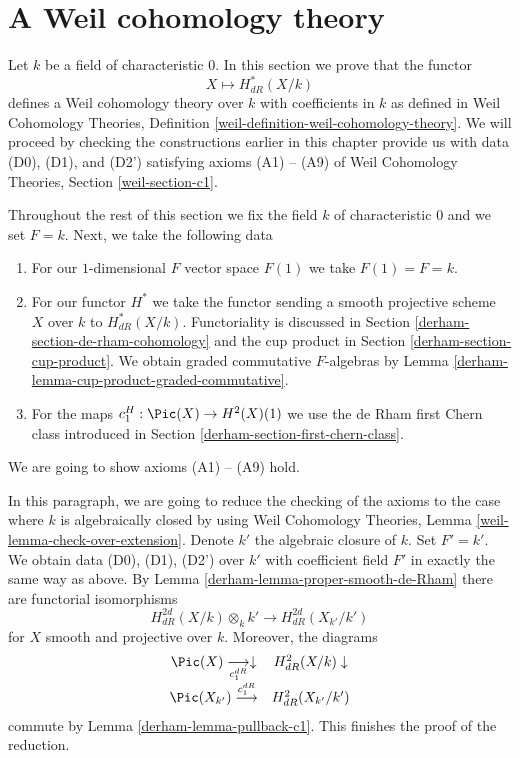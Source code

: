 \section{A Weil cohomology theory}
\label{derham-section-weil}
Let $k$ be a field of characteristic $0$. In this section we prove that
the functor
$$
X \longmapsto H^*_{dR}(X/k)
$$
defines a Weil cohomology theory over $k$ with coefficients in $k$ as defined
in Weil Cohomology Theories, Definition
\ref{weil-definition-weil-cohomology-theory}.
We will proceed by checking the constructions earlier in this
chapter provide us with data (D0), (D1), and (D2') satisfying
axioms (A1) -- (A9) of
Weil Cohomology Theories, Section \ref{weil-section-c1}.

\medskip\noindent
Throughout the rest of this section we fix the field $k$ of characteristic
$0$ and we set $F = k$. Next, we take the following data
\begin{enumerate}
\item[(D0)] For our $1$-dimensional $F$ vector space $F(1)$ we take
$F(1) = F = k$.
\item[(D1)] For our functor $H^*$ we take the functor sending
a smooth projective scheme $X$ over $k$ to $H^*_{dR}(X/k)$.
Functoriality is discussed in Section \ref{derham-section-de-rham-cohomology}
and the cup product in Section \ref{derham-section-cup-product}.
We obtain graded commutative $F$-algebras by
Lemma \ref{derham-lemma-cup-product-graded-commutative}.
\item[(D2')] For the maps $c_1^H : \Pic(X) \to H^2(X)(1)$ we
use the de Rham first Chern class introduced in
Section \ref{derham-section-first-chern-class}.
\end{enumerate}
We are going to show axioms (A1) -- (A9) hold.

\medskip\noindent
In this paragraph, we are going to reduce the checking of the
axioms to the case where $k$ is algebraically closed by
using Weil Cohomology Theories, Lemma \ref{weil-lemma-check-over-extension}.
Denote $k'$ the algebraic closure of $k$.
Set $F' = k'$. We obtain data (D0), (D1), (D2') over $k'$ with
coefficient field $F'$ in exactly the same way as above.
By Lemma \ref{derham-lemma-proper-smooth-de-Rham} there are
functorial isomorphisms
$$
H_{dR}^{2d}(X/k) \otimes_k k'
\longrightarrow
H_{dR}^{2d}(X_{k'}/k')
$$
for $X$ smooth and projective over $k$. Moreover, the diagrams
$$
\begin{array}{cc}\Pic(X) \underset{c^{dR}_1}{\longrightarrow}\downarrow & H_{dR}^2(X/k) \downarrow \\ \Pic(X_{k'}) \overset{c^{dR}_1}{\longrightarrow} & H_{dR}^2(X_{k'}/k')\end{array}
$$
commute by Lemma \ref{derham-lemma-pullback-c1}.
This finishes the proof of the reduction.

